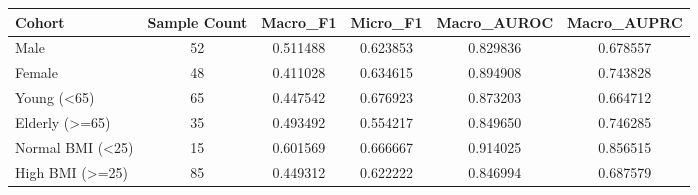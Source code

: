 \begin{tabular}{lccccc}
\toprule
Cohort & Sample Count & Macro_F1 & Micro_F1 & Macro_AUROC & Macro_AUPRC \\
\midrule
Male & 52 & 0.511488 & 0.623853 & 0.829836 & 0.678557 \\
Female & 48 & 0.411028 & 0.634615 & 0.894908 & 0.743828 \\
Young (<65) & 65 & 0.447542 & 0.676923 & 0.873203 & 0.664712 \\
Elderly (>=65) & 35 & 0.493492 & 0.554217 & 0.849650 & 0.746285 \\
Normal BMI (<25) & 15 & 0.601569 & 0.666667 & 0.914025 & 0.856515 \\
High BMI (>=25) & 85 & 0.449312 & 0.622222 & 0.846994 & 0.687579 \\
\bottomrule
\end{tabular}
